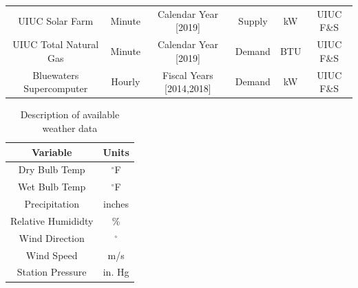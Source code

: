 \begin{landscape}
\begin{table}
\begin{tabular}{c|c|c|c|c|c}
      UIUC Solar Farm & Minute & Calendar Year [2019] & Supply & kW & UIUC F\&S\\
      UIUC Total Natural Gas & Minute & Calendar Year [2019] & Demand & BTU & UIUC F\&S\\
      Bluewaters Supercomputer & Hourly & Fiscal Years [2014,2018] & Demand & kW & UIUC F\&S\\
    \end{tabular}
  \end{table}
\end{landscape}


\begin{table}
  \centering
  \caption{Description of available weather data}
  \label{tab:weather}
  \begin{tabular}{c|c}
  \hline
  Variable  & Units\\
  \hline
  Dry Bulb Temp  & $^\circ$F\\
  Wet Bulb Temp  & $^\circ$F\\
  Precipitation  & inches \\
  Relative Humididty  & \%\\
  Wind Direction  & $^\circ$\\
  Wind Speed  & m/s\\
  Station Pressure & in. Hg \\
  \end{tabular}
\end{table}
